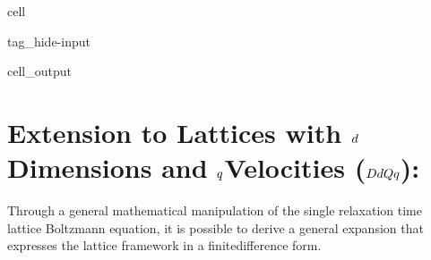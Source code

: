 \documentclass[letterpaper,10pt,english,openany,oneside]{jupyterBook}
\begin{document}
\begin{sphinxuseclass}{cell}
\begin{sphinxuseclass}{tag_hide-input}\begin{sphinxVerbatimOutput}

\begin{sphinxuseclass}{cell_output}
\noindent{}

\end{sphinxuseclass}\end{sphinxVerbatimOutput}

\end{sphinxuseclass}
\end{sphinxuseclass}

\section{Extension to Lattices with \protect\(d\protect\)\sphinxhyphen{}Dimensions and \protect\(q\protect\)\sphinxhyphen{}Velocities (\protect\(DdQq\protect\)):}
\label{\detokenize{Refs/LBM-Study/FDM-Belloti/FDM-LBM-Diffusive:extension-to-lattices-with-d-dimensions-and-q-velocities-ddqq}}
\sphinxAtStartPar
Through a general mathematical manipulation of the single relaxation time lattice Boltzmann equation, it is possible to derive a general expansion that expresses the lattice framework in a finite\sphinxhyphen{}difference form.
\end{document}

